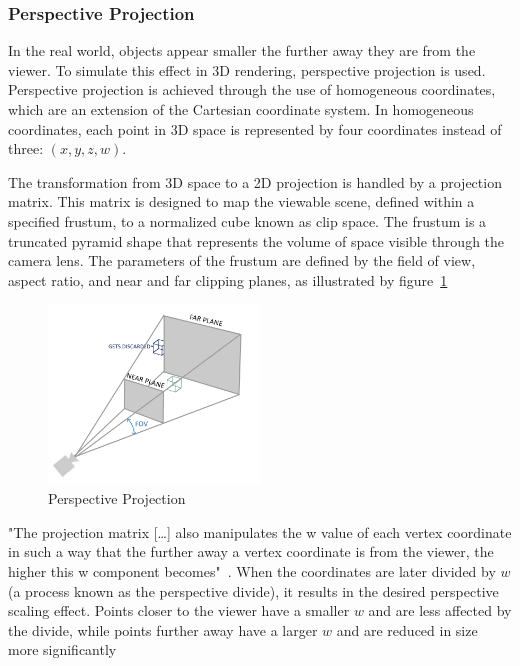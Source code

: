 \subsubsection{Perspective Projection}\label{sec:perspective-projection}
In the real world, objects appear smaller the further away they are from the viewer.
To simulate this effect in 3D rendering, perspective projection is used.
Perspective projection is achieved through the use of homogeneous coordinates,
which are an extension of the Cartesian coordinate system.
In homogeneous coordinates, each point in 3D space is represented by four coordinates instead of three: $(x, y, z, w)$.

The transformation from 3D space to a 2D projection is handled by a projection matrix.
This matrix is designed to map the viewable scene, defined within a specified frustum, to a normalized cube known as clip space.
The frustum is a truncated pyramid shape that represents the volume of space visible through the camera lens.
The parameters of the frustum are defined by the field of view, aspect ratio, and near and far clipping planes,
as illustrated by figure~\ref{fig:perspective}
\begin{figure}[h]
    \centering
    \includegraphics[width=0.50\textwidth]{images/perspective}
    \caption{Perspective Projection}
    \label{fig:perspective}
\end{figure}

"The projection matrix [\ldots] also manipulates the w value of each vertex coordinate in such a way
that the further away a vertex coordinate is from the viewer, the higher this w component becomes"~\parencite{de_vries_learn_2020}.
When the coordinates are later divided by $w$ (a process known as the perspective divide), %
it results in the desired perspective scaling effect.
Points closer to the viewer have a smaller $w$ and are less affected by the divide,
while points further away have a larger $w$ and are reduced in size more significantly

